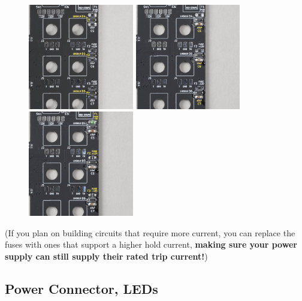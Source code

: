 \documentclass[12pt, a4paper]{article}
\begin{document}
\begin{figure}[H]
    \centering
    \includegraphics[width=46mm]{images/11_01_diodes_soldered.jpg}
    \hspace{2mm}
    \includegraphics[width=46mm]{images/11_02_caps_soldered.jpg}
    \hspace{2mm}
    \includegraphics[width=46mm]{images/11_03_fuses_soldered.jpg}
\end{figure}

\begin{quoting}
    \small
    (If you plan on building circuits that require more current, you can replace the fuses with
    ones that support a higher hold current, \textbf{making sure your power supply can still
    supply their rated trip current!})
\end{quoting}

\pagebreak
\subsection{Power Connector, LEDs}
\end{document}
